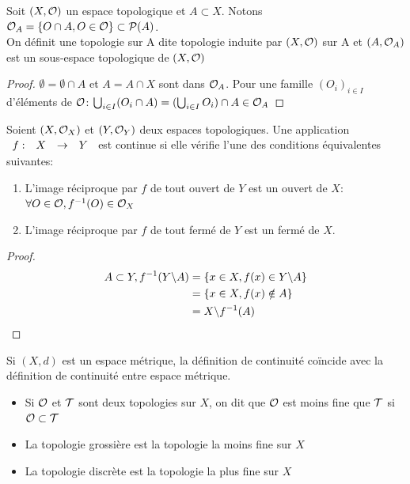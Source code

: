 \documentclass[]{report}
\begin{document}
    \begin{prop}{}{}
        Soit $(X,\mathcal{O})$ un espace topologique et $A\subset X$. Notons $\mathcal{O}_A=\{O\cap A, O\in \mathcal{O}\}\subset \mathcal{P}(A)$.\\
        On définit une topologie sur A dite topologie induite par $(X,\mathcal{O})$ sur A et $(A,\mathcal{O}_A)$ est un sous-espace topologique de $(X,\mathcal{O})$
    \end{prop}

    \begin{proof}
        $\emptyset=\emptyset\cap A$ et $A=A\cap X$ sont dans $\mathcal{O}_A$. Pour une famille $(O_i)_{i\in I}$ d'éléments de $\mathcal{O}$: $\bigcup_{i\in I} (O_i\cap A)=(\bigcup_{i\in I} O_i)\cap A \in \mathcal{O}_A$
    \end{proof}

    \begin{dfprop}{}{}
        Soient $(X,\mathcal{O}_X)$ et $(Y,\mathcal{O}_Y)$ deux espaces topologiques. Une application $\begin{array}{ccccc} f : & X & \to & Y \end{array}$ est continue si elle vérifie l'une des conditions équivalentes suivantes:
        \begin{enumerate}
            \item L'image réciproque par $f$ de tout ouvert de $Y$ est un ouvert de $X$: $\forall O\in \mathcal{O}, f^{-1}(O)\in\mathcal{O}_X$
            \item L'image réciproque par $f$ de tout fermé de $Y$ est un fermé de $X$.
        \end{enumerate}
    \end{dfprop}

    \begin{proof}
        \begin{align*}
            A\subset Y, f^{-1}(Y\backslash A)&=\{x\in X, f(x)\in Y\backslash A\}\\
            &=\{x\in X, f(x)\notin A \}\\
            &=X\backslash f^{-1}(A)
        \end{align*}
    \end{proof}

    \begin{ex}{}{}
        Si $(X,d)$ est un espace métrique, la définition de continuité coïncide avec la définition de continuité entre espace métrique.
    \end{ex}

    \begin{re}{}{}
        \begin{itemize}
            \item Si $\mathcal{O}$ et $\mathcal{T}$ sont deux topologies sur $X$, on dit que $\mathcal{O}$ est moins fine que $\mathcal{T}$ si $\mathcal{O}\subset \mathcal{T}$
            \item La topologie grossière est la topologie la moins fine sur $X$
            \item La topologie discrète est la topologie la plus fine sur $X$
        \end{itemize}
    \end{re}
\end{document}
